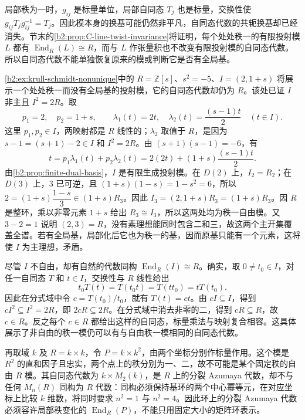 \ProseParagraphBreak
局部秩为一时，\(g_{ij}\) 是标量单位，局部自同态 \(T_j\) 也是标量，交换性使 \(g_{ij}T_jg_{ij}^{-1}=T_j\)。因此模本身的换基可能仍然非平凡，自同态代数的共轭换基却已经消失。节末的\cref{b2:prop:C-line-twist-invariance}将证明，每个处处秩一的有限投射模 \(L\) 都有 \(\operatorname{End}_R(L)\cong R\)，而与 \(L\) 作张量积也不改变有限投射模的自同态代数。所以自同态代数不能单独恢复原来的模或判断它是否有全局基。

\ProseParagraphBreak
\cref{b2:ex:krull-schmidt-nonunique}中的 \(R=\mathbb Z[s]\)、\(s^2=-5\)、\(I=(2,1+s)\) 将展示一个处处秩一而没有全局基的投射模，它的自同态代数却仍为 \(R\)。该处已证 \(I\) 非主且 \(I^2=2R\)。取
\[
	p_1=2,\quad p_2=1+s,\qquad \lambda_1(t)=2t,\quad\lambda_2(t)=\frac{(s-1)t}{2} \quad(t\in I).
\]
这里 \(p_1,p_2\in I\)，两映射都是 \(R\) 线性的；\(\lambda_2\) 取值于 \(R\)，是因为 \(s-1=(s+1)-2\in I\) 和 \(I^2=2R\)。由 \((s+1)(s-1)=-6\)，有
\[
	t=p_1\lambda_1(t)+p_2\lambda_2(t) =2(2t)+(1+s)\frac{(s-1)t}{2}.
\]
由\cref{b2:prop:finite-dual-basis}，\(I\) 是有限生成投射模。在 \(D(2)\) 上，\(I_2=R_2\)；在 \(D(3)\) 上，\(3\) 已可逆，且 \((1+s)(1-s)=1-s^2=6\)，所以 \(2=(1+s)\dfrac{1-s}{3}\in(1+s)R_3\)。因此 \(I_3=(2,1+s)R_3=(1+s)R_3\)。因 \(R\) 是整环，乘以非零元素 \(1+s\) 给出 \(R_3\cong I_3\)，所以这两处均为秩一自由模。又 \(3-2=1\) 说明 \((2,3)=R\)，没有素理想能同时包含二和三，故这两个主开集覆盖全谱。若有全局基，局部化后它也为秩一的基，因而原基只能有一个元素，这将使 \(I\) 为主理想，矛盾。

\ProseParagraphBreak
尽管 \(I\) 不自由，却有自然的代数同构 \(\operatorname{End}_R(I)\cong R\)。确实，取 \(0\ne t_0\in I\)，对任一自同态 \(T\) 和 \(t\in I\)，交换性与 \(R\) 线性给出
\[
	t_0T(t)=T(t_0t)=T(tt_0)=tT(t_0).
\]
因此在分式域中令 \(c=T(t_0)/t_0\)，就有 \(T(t)=ct\)。由 \(cI\subseteq I\)，得到 \(cI^2\subseteq I^2=2R\)，即 \(2cR\subseteq2R\)。在分式域中消去非零的二，得到 \(cR\subseteq R\)，故 \(c\in R\)。反之每个 \(c\in R\) 都给出这样的自同态，标量乘法与映射复合相容。这具体展示了非自由的秩一模仍可以有与自由秩一模相同的自同态代数。

\ProseParagraphBreak
再取域 \(k\) 及 \(R=k\times k\)，令 \(P=k\times k^2\)，由两个坐标分别作标量作用。这个模是 \(R^2\) 的直和因子且忠实，两个点上的秩分别为一、二，故不可能是某个固定秩的自由 \(R\) 模。其自同态代数为 \(k\times M_2(k)\)，是 \(R\) 上的分裂 Azumaya 代数，却不与任何 \(M_n(R)\) 同构为 \(R\) 代数：同构必须保持基环的两个中心幂等元，在对应坐标上比较 \(k\) 维数，将同时要求 \(n^2=1\) 与 \(n^2=4\)。因此环上的分裂 Azumaya 代数必须容许局部秩变化的 \(\operatorname{End}_R(P)\)，不能只用固定大小的矩阵环表示。

